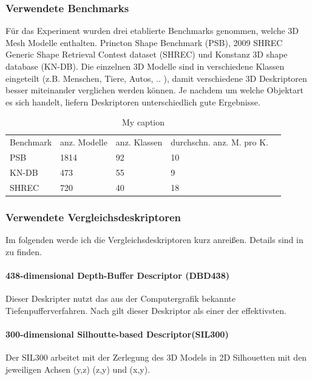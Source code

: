\subsubsection{Verwendete Benchmarks}
Für das Experiment wurden drei etablierte Benchmarks genommen, welche 3D Mesh Modelle enthalten. Princton Shape Benchmark (PSB), 2009 SHREC Generic Shape Retrieval Contest dataset (SHREC) und Konstanz 3D shape database (KN-DB). Die einzelnen 3D Modelle sind in verschiedene Klassen eingeteilt (z.B. Menschen, Tiere, Autos, .. ), damit verschiedene 3D Deskriptoren besser miteinander verglichen werden können. Je nachdem um welche Objektart es sich handelt, liefern Deskriptoren unterschiedlich gute Ergebnisse. 

\begin{table}[H]
	\centering
	\caption{My caption}
	\label{my-label}
	\begin{tabular}{lllll}
		Benchmark & anz. Modelle & anz. Klassen & durchschn. anz. M. pro K. &  \\
		PSB       & 1814         & 92           & 10                                 &  \\
		KN-DB     & 473          & 55           & 9                                  &  \\
		SHREC     & 720          & 40          & 18                                & 
	\end{tabular}
\end{table}
\subsubsection{Verwendete Vergleichsdeskriptoren}
Im folgenden werde ich die Vergleichsdeskriptoren kurz anreißen. Details sind in \cite{dvvra3DModelret} zu finden.

\paragraph{438-dimensional Depth-Buffer Descriptor (DBD438)}
Dieser Deskripter nutzt das aus der Computergrafik bekannte Tiefenpufferverfahren. Nach \cite{scherer2010histograms} gilt dieser Deskriptor als einer der effektivsten.

\paragraph{300-dimensional Silhoutte-based Descriptor(SIL300)}
Der SIL300 arbeitet mit der Zerlegung des 3D Models in 2D Silhouetten 
mit den jeweiligen Achsen (y,z) (z,y) und (x,y).

